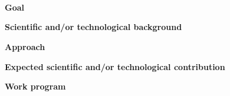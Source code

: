 \documentclass{article}
\title{
    \vspace{2in}
    \textmd{\textbf{\hmwkClass}}\\
    \normalsize\vspace{0.1in}{\hmwkTitle}\\
    \vspace{0.1in}\large{\textit{\hmwkClassTime}}\\
    \vspace{2in}
}
\author{\hmwkAuthorName}
\date{}
\begin{document}
\maketitle

\pagebreak

\textbf{Goal}\newline

\textbf{Scientific and/or technological background}\newline

\textbf{Approach}\newline

\textbf{Expected scientific and/or technological contribution}\newline

\textbf{Work program}\newline
\end{document}
